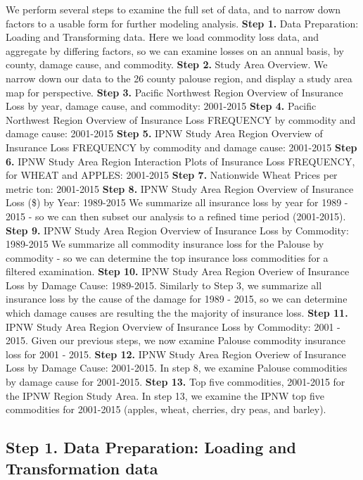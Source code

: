 \documentclass[]{article}
\begin{document}
We perform several steps to examine the full set of data, and to narrow
down factors to a usable form for further modeling analysis.
\textbf{Step 1.} Data Preparation: Loading and Transforming data. Here
we load commodity loss data, and aggregate by differing factors, so we
can examine losses on an annual basis, by county, damage cause, and
commodity. \textbf{Step 2.} Study Area Overview. We narrow down our data
to the 26 county palouse region, and display a study area map for
perspective. \textbf{Step 3.} Pacific Northwest Region Overview of
Insurance Loss by year, damage cause, and commodity: 2001-2015
\textbf{Step 4.} Pacific Northwest Region Overview of Insurance Loss
FREQUENCY by commodity and damage cause: 2001-2015 \textbf{Step 5.} IPNW
Study Area Region Overview of Insurance Loss FREQUENCY by commodity and
damage cause: 2001-2015 \textbf{Step 6.} IPNW Study Area Region
Interaction Plots of Insurance Loss FREQUENCY, for WHEAT and APPLES:
2001-2015 \textbf{Step 7.} Nationwide Wheat Prices per metric ton:
2001-2015 \textbf{Step 8.} IPNW Study Area Region Overview of Insurance
Loss (\$) by Year: 1989-2015 We summarize all insurance loss by year for
1989 - 2015 - so we can then subset our analysis to a refined time
period (2001-2015). \textbf{Step 9.} IPNW Study Area Region Overview of
Insurance Loss by Commodity: 1989-2015 We summarize all commodity
insurance loss for the Palouse by commodity - so we can determine the
top insurance loss commodities for a filtered examination. \textbf{Step
10.} IPNW Study Area Region Overiew of Insurance Loss by Damage Cause:
1989-2015. Similarly to Step 3, we summarize all insurance loss by the
cause of the damage for 1989 - 2015, so we can determine which damage
causes are resulting the the majority of insurance loss. \textbf{Step
11.} IPNW Study Area Region Overview of Insurance Loss by Commodity:
2001 - 2015. Given our previous steps, we now examine Palouse commodity
insurance loss for 2001 - 2015. \textbf{Step 12.} IPNW Study Area Region
Overiew of Insurance Loss by Damage Cause: 2001-2015. In step 8, we
examine Palouse commodities by damage cause for 2001-2015. \textbf{Step
13.} Top five commodities, 2001-2015 for the IPNW Region Study Area. In
step 13, we examine the IPNW top five commodities for 2001-2015 (apples,
wheat, cherries, dry peas, and barley).

\subsection{Step 1. Data Preparation: Loading and Transformation
data}\label{step-1.-data-preparation-loading-and-transformation-data}
\end{document}
